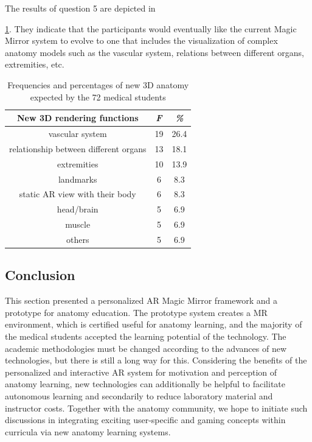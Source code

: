 {{{{{The results of question 5 are depicted in \tablename{\ref{tb:3-MMC:question5}. They indicate that the participants would eventually like the current Magic Mirror system to evolve to one that includes the visualization of complex anatomy models such as the vascular system, relations between different organs, extremities, etc. 
\begin{table}
	\caption[3D anatomy expected]{Frequencies and percentages of new 3D anatomy expected by the 72 medical students}
	\centering
	\label{tb:3-MMC:question5}
	\scriptsize
	\begin{center}
		\begin{tabular}{ccc}
			New 3D rendering functions & \textit{F} & \textit{\%} \\
			\hline
			vascular system &	19 &	26.4 \\
			relationship between different organs&	13	&18.1\\
			extremities &	10&	13.9\\
			landmarks&	6&	8.3\\
			static AR view with their body&	6	&8.3\\
			head/brain	&5	&6.9\\
			muscle&	5&	6.9\\
			others&	5&	6.9\\
			\hline
		\end{tabular}
	\end{center}
\end{table}

\subsection{Conclusion}
This section presented a personalized AR Magic Mirror framework and a prototype for anatomy education.
The prototype system creates a MR environment, which is certified useful for anatomy learning, and the majority of the medical students accepted the learning potential of the technology. 
The academic methodologies must be changed according to the advances of new technologies, but there is still a long way for this. 
Considering the benefits of the personalized and interactive AR system for motivation and perception of anatomy learning, new technologies can additionally be helpful to facilitate autonomous learning and secondarily to reduce laboratory material and instructor costs. Together with the anatomy community, we hope to initiate such discussions in integrating exciting user-specific and gaming concepts within curricula via new anatomy learning systems. 

}}}}}}
